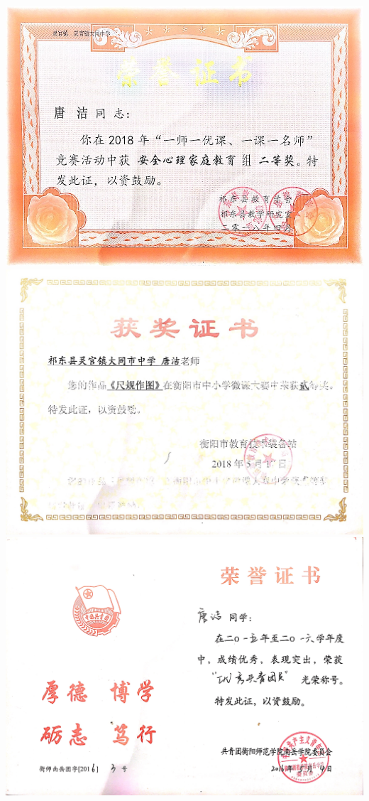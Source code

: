 \documentclass[UFT8]{ctexart}%
\begin{document}
\begin{center}
 \includegraphics[scale=0.37]{figs/2018-04.jpg }
 \includegraphics[scale=0.25]{figs/2018-05.jpg }
 \includegraphics[scale=0.1]{figs/2016-05.jpg }

\end{center}
\end{document}
